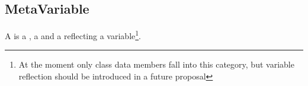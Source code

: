 \subsection{MetaVariable}
\label{concept-MetaVariable}

A  is a , a  and a 
reflecting a variable\footnote{At the moment only class data members fall
into this category, but variable reflection should be introduced in a future
proposal}.



%
